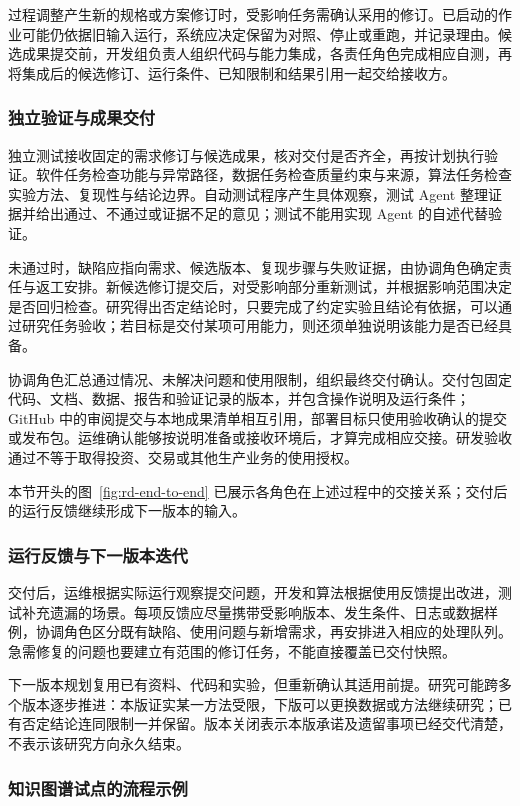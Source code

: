\documentclass[11pt,a4paper]{article}
\begin{document}
过程调整产生新的规格或方案修订时，受影响任务需确认采用的修订。已启动的作业可能仍依据旧输入运行，系统应决定保留为对照、停止或重跑，并记录理由。候选成果提交前，开发组负责人组织代码与能力集成，各责任角色完成相应自测，再将集成后的候选修订、运行条件、已知限制和结果引用一起交给接收方。

\subsubsection{独立验证与成果交付}

独立测试接收固定的需求修订与候选成果，核对交付是否齐全，再按计划执行验证。软件任务检查功能与异常路径，数据任务检查质量约束与来源，算法任务检查实验方法、复现性与结论边界。自动测试程序产生具体观察，测试 Agent 整理证据并给出通过、不通过或证据不足的意见；测试不能用实现 Agent 的自述代替验证。

未通过时，缺陷应指向需求、候选版本、复现步骤与失败证据，由协调角色确定责任与返工安排。新候选修订提交后，对受影响部分重新测试，并根据影响范围决定是否回归检查。研究得出否定结论时，只要完成了约定实验且结论有依据，可以通过研究任务验收；若目标是交付某项可用能力，则还须单独说明该能力是否已经具备。

协调角色汇总通过情况、未解决问题和使用限制，组织最终交付确认。交付包固定代码、文档、数据、报告和验证记录的版本，并包含操作说明及运行条件；GitHub 中的审阅提交与本地成果清单相互引用，部署目标只使用验收确认的提交或发布包。运维确认能够按说明准备或接收环境后，才算完成相应交接。研发验收通过不等于取得投资、交易或其他生产业务的使用授权。

本节开头的图~\ref{fig:rd-end-to-end} 已展示各角色在上述过程中的交接关系；交付后的运行反馈继续形成下一版本的输入。

\subsubsection{运行反馈与下一版本迭代}

交付后，运维根据实际运行观察提交问题，开发和算法根据使用反馈提出改进，测试补充遗漏的场景。每项反馈应尽量携带受影响版本、发生条件、日志或数据样例，协调角色区分既有缺陷、使用问题与新增需求，再安排进入相应的处理队列。急需修复的问题也要建立有范围的修订任务，不能直接覆盖已交付快照。

下一版本规划复用已有资料、代码和实验，但重新确认其适用前提。研究可能跨多个版本逐步推进：本版证实某一方法受限，下版可以更换数据或方法继续研究；已有否定结论连同限制一并保留。版本关闭表示本版承诺及遗留事项已经交代清楚，不表示该研究方向永久结束。

\subsubsection{知识图谱试点的流程示例}
\end{document}
